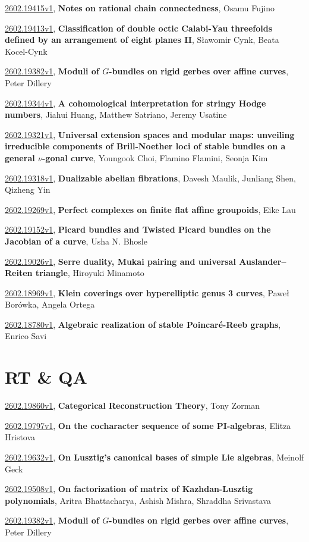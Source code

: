 \documentclass[9pt, a4paper]{article}
\theoremstyle{plain}
\theoremstyle{definition}
\theoremstyle{remark}
\newcommand{\arxiv}[3]{\href{https://arxiv.org/abs/#1}{#1}, \textbf{\textcolor{arxivblue}{#2}}, #3}
\begin{document}
\arxiv{2602.19415v1}{Notes on rational chain connectedness}{Osamu Fujino}

\arxiv{2602.19413v1}{Classification of double octic Calabi-Yau threefolds defined by an arrangement of eight planes II}{Sławomir Cynk, Beata Kocel-Cynk}

\arxiv{2602.19382v1}{Moduli of $G$-bundles on rigid gerbes over affine curves}{Peter Dillery}

\arxiv{2602.19344v1}{A cohomological interpretation for stringy Hodge numbers}{Jiahui Huang, Matthew Satriano, Jeremy Usatine}

\arxiv{2602.19321v1}{Universal extension spaces and modular maps: unveiling irreducible components of Brill-Noether loci of stable bundles on a general $ν$-gonal curve}{Youngook Choi, Flamino Flamini, Seonja Kim}

\arxiv{2602.19318v1}{Dualizable abelian fibrations}{Davesh Maulik, Junliang Shen, Qizheng Yin}

\arxiv{2602.19269v1}{Perfect complexes on finite flat affine groupoids}{Eike Lau}

\arxiv{2602.19152v1}{Picard bundles and Twisted Picard bundles on the Jacobian of a curve}{Usha N. Bhosle}

\arxiv{2602.19026v1}{Serre duality, Mukai pairing and universal Auslander--Reiten triangle}{Hiroyuki Minamoto}

\arxiv{2602.18969v1}{Klein coverings over hyperelliptic genus 3 curves}{Paweł Borówka, Angela Ortega}

\arxiv{2602.18780v1}{Algebraic realization of stable Poincaré-Reeb graphs}{Enrico Savi}


\section{RT \& QA}
\arxiv{2602.19860v1}{Categorical Reconstruction Theory}{Tony Zorman}

\arxiv{2602.19797v1}{On the cocharacter sequence of some PI-algebras}{Elitza Hristova}

\arxiv{2602.19632v1}{On Lusztig's canonical bases of simple Lie algebras}{Meinolf Geck}

\arxiv{2602.19508v1}{On factorization of matrix of Kazhdan-Lusztig polynomials}{Aritra Bhattacharya, Ashish Mishra, Shraddha Srivastava}

\arxiv{2602.19382v1}{Moduli of $G$-bundles on rigid gerbes over affine curves}{Peter Dillery}
\end{document}
